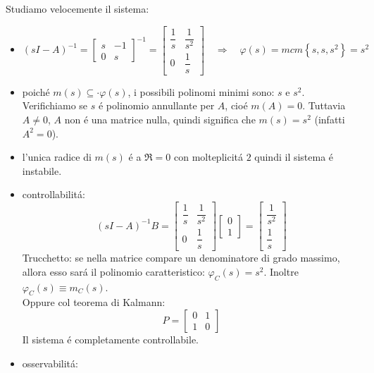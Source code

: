 \documentclass[../main.tex]{subfiles}
\begin{document}
\begin{mdframed}[style=Exercise]
\begin{Exercise}[title={Retroazione algebrica sull'uscita}, difficulty=1]
				Studiamo velocemente il sistema:
				\begin{itemize}
					\item 
						\[
							(sI-A)^{-1} =
							\begin{bmatrix}
								s & -1\\
								0 & s
							\end{bmatrix}^{-1} =
							\begin{bmatrix}
								\dfrac{1}{s} & \dfrac{1}{s^2}\\[.5cm]
								0 & \dfrac{1}{s}
							\end{bmatrix}
							\quad\Rightarrow\quad
							\varphi(s) = mcm\left\lbrace s, s, s^2 \right\rbrace = s^2
						\]
					\item 
						poich\'e $ m(s) \subseteq\cdot \varphi(s) $, i possibili polinomi minimi sono: $ s $ e $ s^2 $. Verifichiamo se $ s $ \'e polinomio annullante per $ A $, cio\'e $ m(A) = 0 $. Tuttavia $ A \neq 0 $, $ A $ non \'e una matrice nulla, quindi significa che $ m(s) = s^2 $ (infatti $ A^2 = 0 $).
					\item 
						l'unica radice di $ m(s) $ \'e a $ \Re = 0 $ con molteplicit\'a $ 2 $ quindi il sistema \'e instabile.
					\item 
						controllabilit\'a:
						\[
							(sI-A)^{-1}B=
							\begin{bmatrix}
								\dfrac{1}{s} & \dfrac{1}{s^2}\\[.5cm]
								0 & \dfrac{1}{s}
							\end{bmatrix}
							\begin{bmatrix}
								0\\
								1
							\end{bmatrix} =
							\begin{bmatrix}
								\dfrac{1}{s^2}\\[.5cm]
								\dfrac{1}{s}
							\end{bmatrix}
						\]
						Trucchetto: se nella matrice compare un denominatore di grado massimo, allora esso sar\'a il polinomio caratteristico: $ \varphi_C(s) = s^2 $. Inoltre $ \varphi_C(s) \equiv m_C(s) $.\\
						Oppure col teorema di Kalmann:
						\[
							P =
							\begin{bmatrix}
								0 & 1\\
								1 & 0
							\end{bmatrix}
						\]
						Il sistema \'e completamente controllabile.
					\item 
						osservabilit\'a:

\end{itemize}
\end{Exercise}
\end{mdframed}
\end{document}
